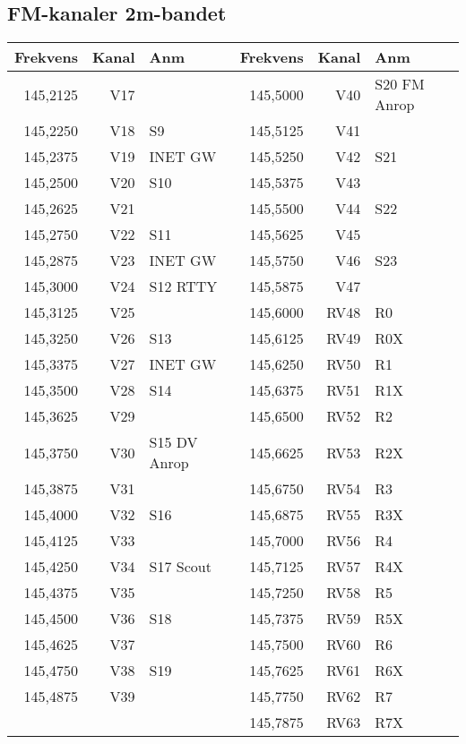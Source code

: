\subsection{FM-kanaler 2m-bandet}

\begin{longtable}{rrl|rrl}

\textbf{Frekvens} & \textbf{Kanal} & \textbf{Anm} &
\textbf{Frekvens} & \textbf{Kanal} & \textbf{Anm} \\ \hline

145,2125 & V17 &              & 145,5000 & V40  & S20  FM Anrop \\
145,2250 & V18 & S9           & 145,5125 & V41  &               \\
145,2375 & V19 & INET GW      & 145,5250 & V42  & S21           \\
145,2500 & V20 & S10          & 145,5375 & V43  &               \\
145,2625 & V21 &              & 145,5500 & V44  & S22           \\
145,2750 & V22 & S11          & 145,5625 & V45  &               \\
145,2875 & V23 & INET GW      & 145,5750 & V46  & S23           \\
145,3000 & V24 & S12  RTTY    & 145,5875 & V47  &               \\
145,3125 & V25 &              & 145,6000 & RV48 & R0            \\
145,3250 & V26 & S13          & 145,6125 & RV49 & R0X           \\
145,3375 & V27 & INET GW      & 145,6250 & RV50 & R1            \\
145,3500 & V28 & S14          & 145,6375 & RV51 & R1X           \\
145,3625 & V29 &              & 145,6500 & RV52 & R2            \\
145,3750 & V30 & S15 DV Anrop & 145,6625 & RV53 & R2X           \\
145,3875 & V31 &              & 145,6750 & RV54 & R3            \\
145,4000 & V32 & S16          & 145,6875 & RV55 & R3X           \\
145,4125 & V33 &              & 145,7000 & RV56 & R4            \\
145,4250 & V34 & S17 Scout    & 145,7125 & RV57 & R4X           \\
145,4375 & V35 &              & 145,7250 & RV58 & R5            \\
145,4500 & V36 & S18          & 145,7375 & RV59 & R5X           \\
145,4625 & V37 &              & 145,7500 & RV60 & R6            \\
145,4750 & V38 & S19          & 145,7625 & RV61 & R6X           \\
145,4875 & V39 &              & 145,7750 & RV62 & R7            \\
         &     &              & 145,7875 & RV63 & R7X
\end{longtable}

